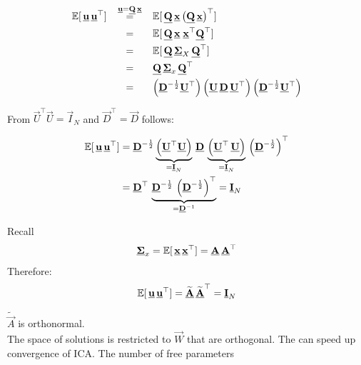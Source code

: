 \begin{frame}


\begin{align}
\E \lbrack\, \vec u \, \vec u^\top \rbrack
&\mystackrel{\vec u = \vec Q\, \vec x}{\vec u = \vec Q\, \vec x}
 \E \lbrack\, \vec Q \, \vec x  \left( \vec Q \, \vec x\right)^\top \rbrack\\
&\mystackrel{\vec u = \vec Q\, \vec x}{}\E \lbrack\, \vec Q \, \vec x \; \vec x^\top \vec Q^\top \rbrack\\
&\mystackrel{\vec u = \vec Q\, \vec x}{} \E \lbrack\, \vec Q \, \vec \Sigma_{X} \, \vec Q^\top \rbrack\\
&\mystackrel{\vec u = \vec Q\, \vec x}{} \vec Q \, \vec \Sigma_{x} \, \vec Q^\top\\
&\mystackrel{\vec u = \vec Q\, \vec x}{}
\left( \vec D^{-\frac{1}{2}} \vec U^\top \right)
\left( \vec U \, \vec D \, \vec U^\top \right)
\left( \vec D^{-\frac{1}{2}} \vec U^\top \right)
\end{align}

\end{frame}
\begin{frame}


From $\vec U^\top\vec U = \vec I_N$ and $\vec D^\top = \vec D$ follows:

\begin{align}
\mathbb{E} \lbrack\, \underline{\mathbf{u}} \, \underline{\mathbf{u}}^\top \rbrack
&=
\underline{\mathbf{D}}^{-\frac{1}{2}}
\underbrace{\left( \underline{\mathbf{U}}^\top  \underline{\mathbf{U}} \right)}_{= \underline{\mathbf{I}}_N}
\, \underline{\mathbf{D}} \, 
\underbrace{\left( \underline{\mathbf{U}}^\top \,  \underline{\mathbf{U}} \right)}_{= \underline{\mathbf{I}}_N}
\,
\left(\underline{\mathbf{D}}^{-\frac{1}{2}} \right)^\top \\
&= \underline{\mathbf{D}}^\top
\, 
\underbrace{\underline{\mathbf{D}}^{-\frac{1}{2}}  \, 
\left(\underline{\mathbf{D}}^{-\frac{1}{2}} \right)^\top}_{=\underline{\mathbf{D}}^{-1}} = \underline{\mathbf{I}}_N
\end{align}


Recall 
$$
\underline{\mathbf{\Sigma}}_x =  \mathbb{E} \lbrack \, \underline{\mathbf{x}} \, \underline{\mathbf{x}}^\top \rbrack
=  \underline{\mathbf{A}}\, \underline{\mathbf{A}}^\top
$$
Therefore:
$$
\mathbb{E} \lbrack \, \underline{\mathbf{u}} \, \underline{\mathbf{u}}^\top \rbrack
= \widetilde {\underline{\mathbf{A}}}\, \widetilde {\underline{\mathbf{A}}}^\top = \underline{\mathbf{I}}_N
$$

$\widetilde{\vec A}$ is orthonormal.\\
The space of solutions is restricted to $\vec W$ that are orthogonal. 
The can speed up convergence of ICA. 
The number of free parameters 
\end{frame}

